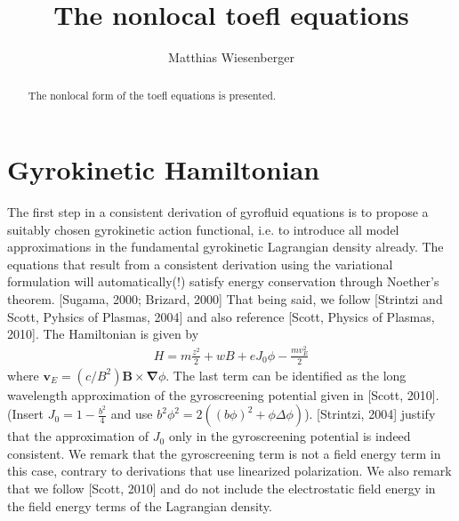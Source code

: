 \documentclass[a4paper,12pt]{scrartcl}
\title{The nonlocal toefl equations}
\author{Matthias  Wiesenberger}
\renewcommand{\vec}[1]{{\mathbf{#1}}}
\begin{document}
\maketitle
\begin{abstract}
    The nonlocal form of the toefl equations is presented.
\end{abstract}
\section{Gyrokinetic Hamiltonian}
The first step in a consistent derivation of gyrofluid equations
is to propose a suitably chosen
gyrokinetic action functional, i.e. to introduce all model approximations 
in the fundamental gyrokinetic Lagrangian density already. The equations that
result from a consistent derivation using 
the variational formulation will automatically(!) satisfy 
energy conservation through Noether's theorem. [Sugama, 2000; Brizard, 2000]
That being said, 
we follow [Strintzi and Scott, Pyhsics of Plasmas, 2004] and also reference
[Scott, Physics of Plasmas, 2010]. 
The Hamiltonian is given by
\begin{align}
    H = m\frac{z^2}{2} + wB+eJ_0\phi- \frac{mv_E^2}{2}
    \label{eq:hamiltonian}
\end{align}
where $\vec v_E= (c/B^2)\vec B \times \vec\nabla \phi$. The last term can be 
identified as the 
long wavelength approximation of the gyroscreening potential given in [Scott, 2010].
(Insert $J_0 = 1-\frac{b^2}{4}$ and use $b^2\phi^2 = 2\left(  ( b\phi)^2 + \phi\Delta \phi\right)$).
[Strintzi, 2004] justify that the approximation of $J_0$ only in the 
gyroscreening potential is indeed consistent. We remark that the gyroscreening
term is not a field energy term in this case, contrary to derivations that 
use linearized polarization. We also remark that we follow [Scott, 2010] and do
not include the electrostatic field energy in the field energy terms of the
Lagrangian density.
\end{document}
